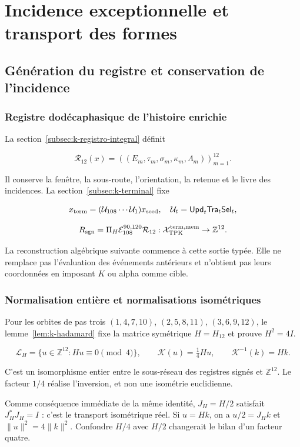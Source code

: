 \section{Incidence exceptionnelle et transport des formes}
\label{nuclear:4}
\subsection{Génération du registre et conservation de l’incidence}

\subsubsection{Registre dodécaphasique de l’histoire enrichie}

La section~\ref{subsec:k-registro-integral} définit

\[
\mathcal R_{12}(x)=((E_m,\tau_m,\sigma_m,\kappa_m,\Lambda_m))_{m=1}^{12}.
\]

Il conserve la fenêtre, la sous-route, l’orientation, la retenue et le livre des incidences. La section~\ref{subsec:k-terminal} fixe

\[
x_{\rm term}=(\mathcal U_{108}\cdots\mathcal U_1)x_{\rm seed},
\quad \mathcal U_t=\mathsf{Upd}_t\mathsf{Tra}_t\mathsf{Sel}_t,
\]

\[
R_{\rm sgn}=\Pi_H\mathcal E_{108}^{90,120}\mathcal R_{12}:
\mathcal X_{\rm TPK}^{\rm term,mem}\to\mathbb Z^{12}.
\]

La reconstruction algébrique suivante commence à cette sortie typée. Elle ne remplace pas l’évaluation des événements antérieurs et n’obtient pas leurs coordonnées en imposant \(K\) ou alpha comme cible.


\subsubsection{Normalisation entière et normalisations isométriques}

Pour les orbites de pas trois \((1,4,7,10)\), \((2,5,8,11)\), \((3,6,9,12)\), le lemme~\ref{lem:k-hadamard} fixe la matrice symétrique \(H=H_{12}\) et prouve \(H^2=4I\).

\[
\mathcal L_H=\{u\in\mathbb Z^{12}:Hu\equiv0\pmod4\},
\qquad \mathscr K(u)=\tfrac14Hu,
\qquad \mathscr K^{-1}(k)=Hk.
\]

C’est un isomorphisme entier entre le sous-réseau des registres signés et \(\mathbb Z^{12}\). Le facteur \(1/4\) réalise l’inversion, et non une isométrie euclidienne.

Comme conséquence immédiate de la même identité, \(J_H=H/2\) satisfait \(J_H^*J_H=I\) : c’est le transport isométrique réel. Si \(u=Hk\), on a \(u/2=J_Hk\) et \(\|u\|^2=4\|k\|^2\). Confondre \(H/4\) avec \(H/2\) changerait le bilan d’un facteur quatre.


